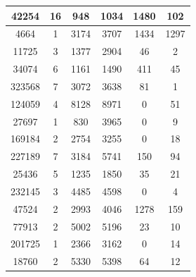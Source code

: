 \begin{table}[]
\begin{tabular}{@{}|c|c|c|c|c|c|@{}}
42254               & 16                 & 948               & 1034            & 1480              & 102             \\ \midrule
4664                & 1                  & 3174              & 3707            & 1434              & 1297            \\ \midrule
11725               & 3                  & 1377              & 2904            & 46                & 2               \\ \midrule
34074               & 6                  & 1161              & 1490            & 411               & 45              \\ \midrule
323568              & 7                  & 3072              & 3638            & 81                & 1               \\ \midrule
124059              & 4                  & 8128              & 8971            & 0                 & 51              \\ \midrule
27697               & 1                  & 830               & 3965            & 0                 & 9               \\ \midrule
169184              & 2                  & 2754              & 3255            & 0                 & 18              \\ \midrule
227189              & 7                  & 3184              & 5741            & 150               & 94              \\ \midrule
25436               & 5                  & 1235              & 1850            & 35                & 21              \\ \midrule
232145              & 3                  & 4485              & 4598            & 0                 & 4               \\ \midrule
47524               & 2                  & 2993              & 4046            & 1278              & 159             \\ \midrule
77913               & 2                  & 5002              & 5196            & 23                & 10              \\ \midrule
201725              & 1                  & 2366              & 3162            & 0                 & 14              \\ \midrule
18760               & 2                  & 5330              & 5398            & 64                & 12              \\ \bottomrule
\end{tabular}
\end{table}

